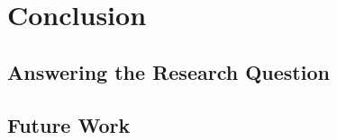 \chapter{Conclusion} \label{ch:conclusion}

\section{Answering the Research Question}

\section{Future Work}
